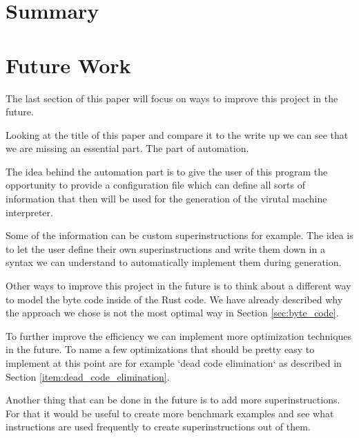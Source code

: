 \documentclass{article}
\begin{document}
\section{Summary}

\section{Future Work}
The last section of this paper will focus on ways to improve this project
in the future.

Looking at the title of this paper and compare it to the write up we can see
that we are missing an essential part. The part of automation.

The idea behind the automation part is to give the user of this program
the opportunity to provide a configuration file which can define all 
sorts of information that then will be used for the generation of the
virutal machine interpreter.

Some of the information can be custom superinstructions for example. The idea
is to let the user define their own superinstructions and write them down in a
syntax we can understand to automatically implement them during generation.

Other ways to improve this project in the future is to think about a different
way to model the byte code inside of the Rust code. We have already described
why the approach we chose is not the most optimal way in Section
\ref{sec:byte_code}.

To further improve the efficiency we can implement more optimization techniques
in the future. To name a few optimizations that should be pretty easy to
implement at this point are for example `dead code elimination` as described in
Section \ref{item:dead_code_elimination}.

Another thing that can be done in the future is to add more superinstructions.
For that it would be useful to create more benchmark examples and see what
instructions are used frequently to create superinstructions out of them.

\clearpage


\end{document}
